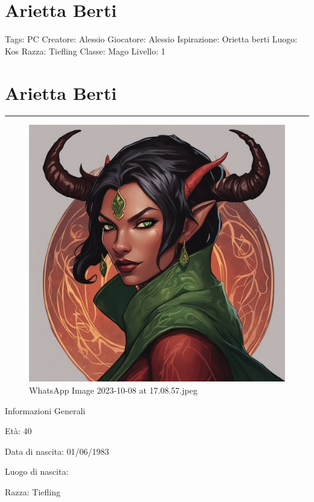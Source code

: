 \section{Arietta Berti}\label{arietta-berti}

Tags: PC Creatore: Alessio Giocatore: Alessio Ispirazione: Orietta berti
Luogo: Kos Razza: Tiefling Classe: Mago Livello: 1

\section{Arietta Berti}\label{arietta-berti-1}

\begin{center}\rule{0.5\linewidth}{0.5pt}\end{center}

\begin{figure}
\centering
\includegraphics{WhatsApp_Image_2023-10-08_at_17.08.57.jpeg}
\caption{WhatsApp Image 2023-10-08 at 17.08.57.jpeg}
\end{figure}

Informazioni Generali

Età: 40

Data di nascita: 01/06/1983

Luogo di nascita:

Razza: Tiefling

